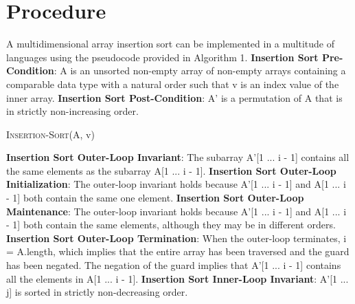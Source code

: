 \documentclass[onecolumn, 12pt, article]{IEEEtran}
\numberwithin{case}{problem}
\numberwithin{condition}{problem}
\numberwithin{condition}{subsection}
\numberwithin{definition}{section}
\theoremstyle{remark}
\numberwithin{question}{problem}
\theoremstyle{plain}
\numberwithin{answer}{problem}
\numberwithin{solution}{section}
\numberwithin{equation}{section}%
\begin{document}

\section{Procedure}
A multidimensional array insertion sort can be implemented in a multitude of languages using the pseudocode provided in Algorithm 1.
\newline
\textbf{Insertion Sort Pre-Condition}: A is an unsorted non-empty array of non-empty arrays containing a comparable data type with a natural order such that v is an index value of the inner array.
\newline
\textbf{Insertion Sort Post-Condition}: A' is a permutation of A that is in strictly non-increasing order.
\begin{algorithm}
\caption {\textsc{Insertion-Sort}(A, v)}
\label{algo:insertionsort}
\begin{algorithmic}[1]
\EndIf
{}
	\EndWhile
\EndWhile
{}
\EndProcedure
\end{algorithmic}
\end{algorithm}
\newline
\textbf{Insertion Sort Outer-Loop Invariant}: The subarray A'[1 ... i - 1] contains all the same elements as the subarray A[1 ... i - 1].
\newline 
\textbf{Insertion Sort Outer-Loop Initialization}: The outer-loop invariant holds because A'[1 ... i - 1] and A[1 ... i - 1] both contain the same one element.
\newline
\textbf{Insertion Sort Outer-Loop Maintenance}: The outer-loop invariant holds because A'[1 ... i - 1] and A[1 ... i - 1] both contain the same elements, although they may be in different orders.
\newline
\textbf{Insertion Sort Outer-Loop Termination}: When the outer-loop terminates, i = A.length, which implies that the entire array has been traversed and the guard has been negated. The negation of the guard implies that A'[1 ... i - 1] contains all the elements in A[1 ... i - 1].
\newline
\newline
\textbf{Insertion Sort Inner-Loop Invariant}: A'[1 ... j] is sorted in strictly non-decreasing order.
\end{document}
